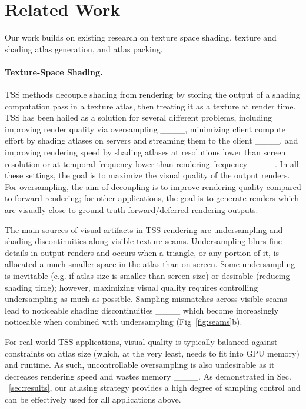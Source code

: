 \section{Related Work}
\label{sec:related}

Our work builds on existing research on texture space shading, texture and shading atlas generation, and atlas packing. 

\paragraph*{Texture-Space Shading.} 
TSS methods decouple shading from rendering by storing the output of a shading computation pass in a texture atlas, then treating it as a texture at render time. TSS has been hailed as a solution for several different problems, including improving render quality via oversampling ____, minimizing client compute effort by shading atlases on servers and streaming them to the client ____, and improving rendering speed by shading atlases at resolutions lower than screen resolution or at temporal frequency lower than rendering frequency ____. In all these settings, the goal is to maximize the visual quality of the output renders. For oversampling, the aim of decoupling is to improve rendering quality compared to forward rendering; for other applications, the goal is to generate renders which are visually close to ground truth forward/deferred rendering outputs.

The main sources of visual artifacts in TSS rendering are undersampling and shading discontinuities along visible texture seams. Undersampling blurs fine details in output renders and occurs when a triangle, or any portion of it, is allocated a much smaller space in the atlas than on screen. Some undersampling is inevitable (e.g. if atlas size is smaller than screen size) or desirable (reducing shading time); however, maximizing visual quality requires controlling undersampling as much as possible. Sampling mismatches across visible seams lead to noticeable shading discontinuities ____ which become increasingly noticeable when combined with undersampling (Fig~\ref{fig:seams}b). 

For real-world TSS applications, visual quality is typically balanced against constraints on atlas size (which, at the very least, needs to fit into GPU memory) and runtime. 
As such, uncontrollable oversampling is also undesirable as it decreases rendering speed and wastes memory ____.
As demonstrated in Sec. ~\ref{sec:results}, our atlasing strategy provides a high degree of sampling control and can be effectively used for all applications above.

